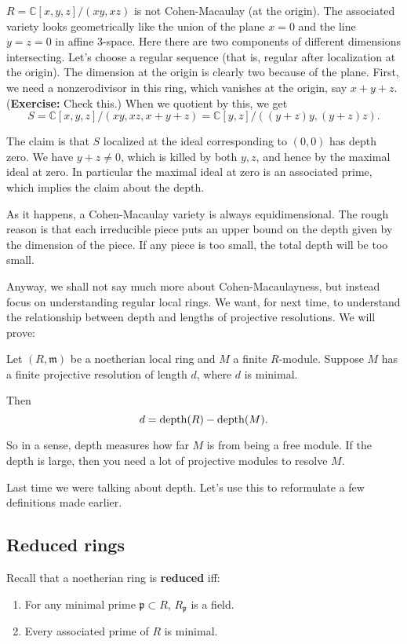 \begin{example} 
$R=\mathbb{C}[x,y,z]/(xy, xz)$ is not Cohen-Macaulay (at the origin). The associated variety looks
geometrically like the union of the plane $x=0$ and the line $y=z=0$ in affine
3-space. Here there are two components of different dimensions intersecting. 
Let's choose a regular sequence (that is, regular after localization at the
origin). The dimension at the origin is clearly two because of the plane.
First, we need a nonzerodivisor in this ring, which vanishes at the origin, say
$ x+y+z$. (\textbf{Exercise:} Check this.) When we quotient by this, we get
\[ S=\mathbb{C}[x,y,z]/(xy,xz, x+y+z)  = \mathbb{C}[y,z]/( (y+z)y, (y+z)z).  \]

The claim is that $S$ localized at the ideal corresponding to $(0,0)$ has depth
zero. We have $y+z \neq 0$, which is killed by both $y,z$, and hence by the
maximal ideal at zero. In particular the maximal ideal at zero is an associated
prime, which implies the claim about the depth.
\end{example} 

As it happens, a Cohen-Macaulay variety is always equidimensional. The rough
reason is that each irreducible piece puts an upper bound on the depth given by
the dimension of the piece. If any piece is too small, the total depth will be
too small. 

Anyway, we shall not say much more about Cohen-Macaulayness, but instead focus
on understanding regular local rings. We want, for next time, to understand the relationship
between depth and lengths of projective resolutions.
We will prove:

\begin{theorem} Let  $(R, \mathfrak{m})$ be a
noetherian local ring and $M$ a finite $R$-module. Suppose $M$ has a finite
projective resolution of length $d$, where $d$ is minimal. 

Then
\[ d = \mathrm{depth}(R) - \mathrm{depth}(M).  \]
\end{theorem} 
So in a sense, depth measures how far $M$ is from being a free module. If the
depth is large, then you need a lot of projective modules to resolve $M$. 

Last time we were talking about depth. Let's use this to reformulate a few
definitions made earlier. 

\subsection{Reduced rings}
Recall that a noetherian ring is \textbf{reduced} iff:
\begin{enumerate}
\item For any minimal prime $\mathfrak{p}  \subset R$, $R_{\mathfrak{p}}$ is a
field.
\item Every associated prime of $R$ is minimal.
\end{enumerate}

